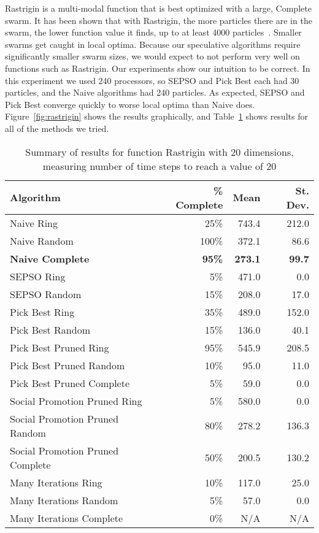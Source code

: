 \documentclass[smallcondensed]{svjour3}
\newcommand{\fig}[1]{Figure~\ref{fig:#1}}
\newcommand{\tabref}[1]{Table~\ref{tab:#1}}
\begin{document}
Rastrigin is a multi-modal function that is best optimized with a large,
Complete swarm.  It has been shown that with Rastrigin, the more particles
there are in the swarm, the lower function value it finds, up to at least 4000
particles~\citep{mcnabb-2009-large-particle-swarms}.  Smaller swarms get caught
in local optima.  Because our speculative algorithms require significantly
smaller swarm sizes, we would expect to not perform very well on functions such
as Rastrigin.  Our experiments show our intuition to be correct.  In this
experiment we used 240 processors, so SEPSO and Pick Best each had 30
particles, and the Naive algorithms had 240 particles.  As expected, SEPSO and
Pick Best converge quickly to worse local optima than Naive does.
\fig{rastrigin} shows the results graphically, and \tabref{rastrigin-20} shows
results for all of the methods we tried.

\begin{table}
  \caption{Summary of results for function Rastrigin with 20 dimensions,
  measuring number of time steps to reach a value of 20}
  \label{tab:rastrigin-20}
  \centering
  \begin{tabular}{|l|r|r|r|}
  \hline
  Algorithm&\% Complete&Mean&St. Dev.\\
  \hline
  \hline
  Naive Ring&25\%&743.4&212.0\\
  \hline
  Naive Random&100\%&372.1&86.6\\
  \hline
  \textbf{Naive Complete}&\textbf{95\%}&\textbf{273.1}&\textbf{99.7}\\
  \hline
  SEPSO Ring&5\%&471.0&0.0\\
  \hline
  SEPSO Random&15\%&208.0&17.0\\
  \hline
  Pick Best Ring&35\%&489.0&152.0\\
  \hline
  Pick Best Random&15\%&136.0&40.1\\
  \hline
  Pick Best Pruned Ring&95\%&545.9&208.5\\
  \hline
  Pick Best Pruned Random&10\%&95.0&11.0\\
  \hline
  Pick Best Pruned Complete&5\%&59.0&0.0\\
  \hline
  Social Promotion Pruned Ring&5\%&580.0&0.0\\
  \hline
  Social Promotion Pruned Random&80\%&278.2&136.3\\
  \hline
  Social Promotion Pruned Complete&50\%&200.5&130.2\\
  \hline
  Many Iterations Ring&10\%&117.0&25.0\\
  \hline
  Many Iterations Random&5\%&57.0&0.0\\
  \hline
  Many Iterations Complete&0\%&N/A&N/A\\
  \hline
  \end{tabular}
\end{table}
\end{document}
